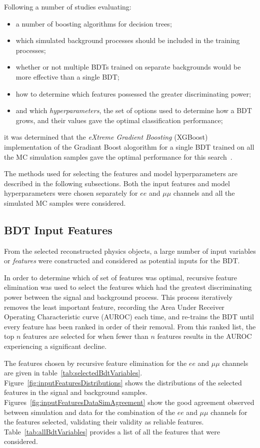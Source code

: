 Following a number of studies evaluating:

\begin{itemize}
\item a number of boosting algorithms for decision trees;
\item which simulated background processes should be included in the training processes;
\item whether or not multiple BDTs trained on separate backgrounds would be more effective than a single BDT;
\item how to determine which features possessed the greater discriminating power;
\item and which \emph{hyperparameters}, the set of options used to determine how a BDT grows, and their values gave the optimal classification performance;
\end{itemize}

it was determined that the \emph{eXtreme Gradient Boosting} (XGBoost) implementation of the Gradiant Boost alogorithm for a single BDT trained on all the MC simulation samples gave the optimal performance for this search~\cite{xgboost}.

The methods used for selecting the features and model hyperparameters are described in the following subsections.
Both the input features and model hyperparameters were chosen separately for $ee$ and $\mu\mu$ channels and all the simulated MC samples were considered.

\subsection{BDT Input Features}
From the selected reconstructed physics objects, a large number of input variables or \emph{features} were constructed and considered as potential inputs for the BDT.

In order to determine which of set of features was optimal, recursive feature elimination was used to select the features which had the greatest discriminating power between the signal and background process.
This process iteratively removes the least important feature, recording the Area Under Receiver Operating Characteristic curve (AUROC) each time, and re-trains the BDT until every feature has been ranked in order of their removal.
From this ranked list, the top $n$ features are selected for when fewer than $n$ features results in the AUROC experiencing a significant decline.
 
The features chosen by recursive feature elimination for the $ee$ and $\mu\mu$ channels are given in table~\ref{tab:selectedBdtVariables}.
Figure~\ref{fig:inputFeaturesDistributions} shows the distributions of the selected features in the signal and background samples.
Figures~\ref{fig:inputFeaturesDataSimAgreement} show the good agreement observed between simulation and data for the combination of the $ee$ and $\mu\mu$ channels for the features selected, validating their validity as reliable features.
Table~\ref{tab:allBdtVariables} provides a list of all the features that were considered.

